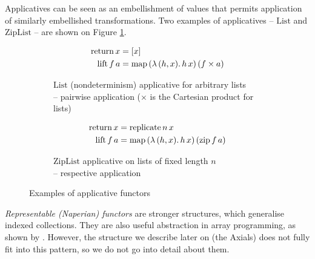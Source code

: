 Applicatives can be seen as an embellishment of values that permits application of similarly embellished transformations. Two examples of applicatives -- $\mathrm{List}$ and $\mathrm{ZipList}$ -- are shown on Figure \ref{fig:applicatives}.
%
\begin{figure}
\centering
\begin{subfigure}{.5\textwidth}
  \centering
  \begin{align*}
\mathrm{return}\,x &= [x] \\
\mathrm{lift}\,f\,a &= \mathrm{map}\,(\lambda\,(h, x) \ldotp h\,x)\,(f \times a)
  \end{align*}
  \caption{$\mathrm{List}$ (nondeterminism) applicative for arbitrary lists \\ -- pairwise application ($\times$ is the Cartesian product for lists)}
\end{subfigure}%
\begin{subfigure}{.5\textwidth}
  \centering
  \begin{align*}
\mathrm{return}\,x &= \mathrm{replicate}\,n\,x \\
\mathrm{lift}\,f\,a &= \mathrm{map}\,(\lambda\,(h, x) \ldotp h\,x)\,(\mathrm{zip}\,f\,a)
  \end{align*}
  \caption{$\mathrm{ZipList}$ applicative on lists of fixed length $n$ \\ -- respective application}
\end{subfigure}
\caption{Examples of applicative functors}
\label{fig:applicatives}
\end{figure}

\textit{Representable (Naperian) functors} are stronger structures, which generalise indexed collections. They are also useful abstraction in array programming, as shown by \textcite{gibbons2016aplicative}. However, the structure we describe later on (the Axials) does not fully fit into this pattern, so we do not go into detail about them.



